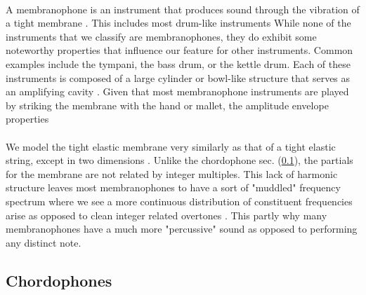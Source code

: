\documentclass[12pt,letterpaper]{article}
\begin{document}
\paragraph*{}A membranophone is an instrument that produces sound through the vibration of a tight membrane \cite{Hornbostel}. This includes most drum-like instruments While none of the instruments that we classify are membranophones, they do exhibit some noteworthy properties that influence our feature for other instruments. Common examples include the tympani, the bass drum, or the kettle drum. Each of these instruments is composed of a large cylinder or bowl-like structure that serves as an amplifying cavity \cite{Olson,White}. Given that most membranophone instruments are played by striking the membrane with the hand or mallet, the amplitude envelope properties 

\paragraph*{}We model the tight elastic membrane very similarly as that of a tight elastic string, except in two dimensions \cite{White}. Unlike the chordophone sec. (\ref{subsec-chordophones}), the partials for the membrane are not related by integer multiples. This lack of harmonic structure leaves most membranophones to have a sort of "muddled" frequency spectrum where we see a more continuous distribution of constituent frequencies arise as opposed to clean integer related overtones \cite{White,Olson}. This partly why many membranophones have a much more "percussive" sound as opposed to performing any distinct note.


\subsection{Chordophones}
\label{subsec-chordophones}
\end{document}
